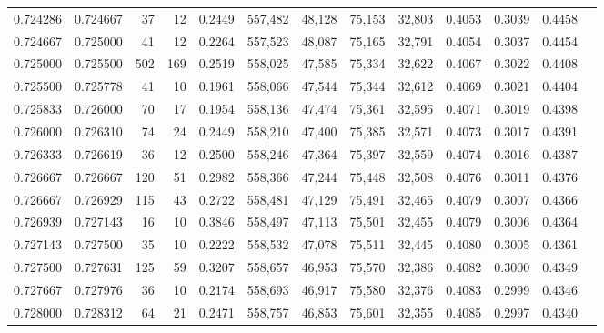 \begin{tabular}{rrrrrrrrrrrrr}
0.724286 & 0.724667 &    37 &  12 &                                     0.2449 & 557,482 &  48,128 &  75,153 &  32,803 & 0.4053 & 0.3039 & 0.4458 \\
0.724667 & 0.725000 &    41 &  12 &                                     0.2264 & 557,523 &  48,087 &  75,165 &  32,791 & 0.4054 & 0.3037 & 0.4454 \\
0.725000 & 0.725500 &   502 & 169 &                                     0.2519 & 558,025 &  47,585 &  75,334 &  32,622 & 0.4067 & 0.3022 & 0.4408 \\
0.725500 & 0.725778 &    41 &  10 &                                     0.1961 & 558,066 &  47,544 &  75,344 &  32,612 & 0.4069 & 0.3021 & 0.4404 \\
0.725833 & 0.726000 &    70 &  17 &                                     0.1954 & 558,136 &  47,474 &  75,361 &  32,595 & 0.4071 & 0.3019 & 0.4398 \\
0.726000 & 0.726310 &    74 &  24 &                                     0.2449 & 558,210 &  47,400 &  75,385 &  32,571 & 0.4073 & 0.3017 & 0.4391 \\
0.726333 & 0.726619 &    36 &  12 &                                     0.2500 & 558,246 &  47,364 &  75,397 &  32,559 & 0.4074 & 0.3016 & 0.4387 \\
0.726667 & 0.726667 &   120 &  51 &                                     0.2982 & 558,366 &  47,244 &  75,448 &  32,508 & 0.4076 & 0.3011 & 0.4376 \\
0.726667 & 0.726929 &   115 &  43 &                                     0.2722 & 558,481 &  47,129 &  75,491 &  32,465 & 0.4079 & 0.3007 & 0.4366 \\
0.726939 & 0.727143 &    16 &  10 &                                     0.3846 & 558,497 &  47,113 &  75,501 &  32,455 & 0.4079 & 0.3006 & 0.4364 \\
0.727143 & 0.727500 &    35 &  10 &                                     0.2222 & 558,532 &  47,078 &  75,511 &  32,445 & 0.4080 & 0.3005 & 0.4361 \\
0.727500 & 0.727631 &   125 &  59 &                                     0.3207 & 558,657 &  46,953 &  75,570 &  32,386 & 0.4082 & 0.3000 & 0.4349 \\
0.727667 & 0.727976 &    36 &  10 &                                     0.2174 & 558,693 &  46,917 &  75,580 &  32,376 & 0.4083 & 0.2999 & 0.4346 \\
0.728000 & 0.728312 &    64 &  21 &                                     0.2471 & 558,757 &  46,853 &  75,601 &  32,355 & 0.4085 & 0.2997 & 0.4340 \\

\end{tabular}
